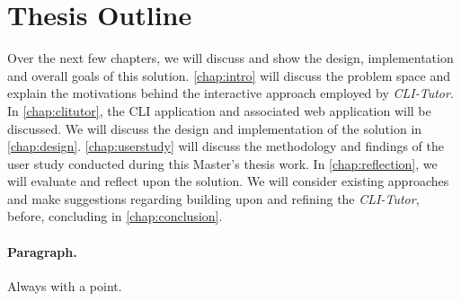 \section{Thesis Outline}

Over the next few chapters, we will discuss and show the design, implementation
and overall goals of this solution. \autoref{chap:intro} will discuss the
problem space and explain the motivations behind the interactive approach
employed by \textit{CLI-Tutor}. In \autoref{chap:clitutor}, the CLI application
and associated web application will be discussed. We will discuss the design
and implementation of the solution in \autoref{chap:design}.
\autoref{chap:userstudy} will discuss the methodology and findings of the user
study conducted during this Master's thesis work. In \autoref{chap:reflection},
we will evaluate and reflect upon the solution. We will consider existing
approaches and make suggestions regarding building upon and refining the
\textit{CLI-Tutor}, before, concluding in \autoref{chap:conclusion}.


\paragraph{Paragraph.} Always with a point. {}
